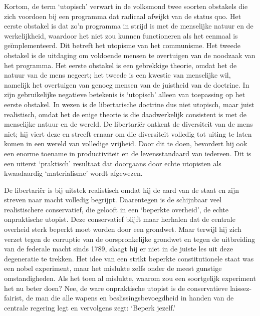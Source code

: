 \documentclass[
  a5paper,
  smalldemyvopaper,10pt,twoside,onecolumn,openright,extrafontsizes,hidelinks]{memoir}
\begin{document}
Kortom, de term `utopisch' verwart in de volksmond twee soorten
obstakels die zich voordoen bij een programma dat radicaal afwijkt van
de status quo. Het eerste obstakel is dat zo'n programma in strijd is
met de menselijke natuur en de werkelijkheid, waardoor het niet zou
kunnen functioneren als het eenmaal is geïmplementeerd. Dit betreft het
utopisme van het communisme. Het tweede obstakel is de uitdaging om
voldoende mensen te overtuigen van de noodzaak van het programma. Het
eerste obstakel is een gebrekkige theorie, omdat het de natuur van de
mens negeert; het tweede is een kwestie van menselijke wil, namelijk het
overtuigen van genoeg mensen van de juistheid van de doctrine. In zijn
gebruikelijke negatieve betekenis is `utopisch' alleen van toepassing op
het eerste obstakel. In wezen is de libertarische doctrine dus niet
utopisch, maar juist realistisch, omdat het de enige theorie is die
daadwerkelijk consistent is met de menselijke natuur en de wereld. De
libertariër ontkent de diversiteit van de mens niet; hij viert deze en
streeft ernaar om die diversiteit volledig tot uiting te laten komen in
een wereld van volledige vrijheid. Door dit te doen, bevordert hij ook
een enorme toename in productiviteit en de levensstandaard van iedereen.
Dit is een uiterst `praktisch' resultaat dat doorgaans door echte
utopisten als kwaadaardig `materialisme' wordt afgewezen.

De libertariër is bij uitstek realistisch omdat hij de aard van de staat
en zijn streven naar macht volledig begrijpt. Daarentegen is de
schijnbaar veel realistischere conservatief, die gelooft in een
`beperkte overheid', de echte onpraktische utopist. Deze conservatief
blijft maar herhalen dat de centrale overheid sterk beperkt moet worden
door een grondwet. Maar terwijl hij zich verzet tegen de corruptie van
de oorspronkelijke grondwet en tegen de uitbreiding van de federale
macht sinds 1789, slaagt hij er niet in de juiste les uit deze
degeneratie te trekken. Het idee van een strikt beperkte constitutionele
staat was een nobel experiment, maar het mislukte zelfs onder de meest
gunstige omstandigheden. Als het toen al mislukte, waarom zou een
soortgelijk experiment het nu beter doen? Nee, de ware onpraktische
utopist is de conservatieve laissez-fairist, de man die alle wapens en
beslissingsbevoegdheid in handen van de centrale regering legt en
vervolgens zegt: `Beperk jezelf.'
\end{document}
